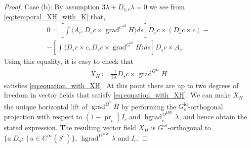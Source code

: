 \documentclass[12pt]{amsart}
\theoremstyle{definition}
\newcommand{\id}{\mathrm{id}}
\newcommand{\OmMW}{\Omega^{\operatorname{MW}}}
\def\la{\lambda}
\def\Om{\Omega}
\def\x{\times}
\let\on=\operatorname
\begin{document}
\begin{proof}
     Case (b): By assumption $3\la+D_{c,c}\la=0$ we see from \eqref{eq:temporal_XH_with_K} that,
     \begin{multline}
         0=\left[\int \langle A_c,D_s c \x \on{grad}^{G^\id} H\rangle ds \right] D_s c \x (D_s c \x c) - 
        \\
        -\left[\int \langle D_s c \x c,  D_s c \x \on{grad}^{G^\id} H\rangle ds \right] D_s c \x A_c.
     \end{multline}
     Using this equality, it is easy to check that
     \begin{align}
         X_H\coloneqq \frac{-1}{3\la} D_s c \x \on{grad}^{G^\id} H
     \end{align}
     satisfies \eqref{eq:equation_with_XH}. At this point there are up to two degrees of freedom in vector fields that satisfy \eqref{eq:equation_with_XH}.
     We can make $X_H$ the unique horizontal lift  of $\on{grad}^{\bar\Om^{\la}}\bar H$ by performing the $G_c^\id$-orthogonal projection with respect to $(1-\on{pr}_c)I_c$ and $\on{hgrad}_c^{\OmMW}\lambda$, and hence obtain the stated expression. The resulting vector field $X_H$ is $G^\id$-orthogonal to $\{a.D_sc \mid a \in C^\infty(S^1)\}$, $\on{hgrad}^{\OmMW}\la$ and $I_c$. 
\end{proof} 
\end{document}
